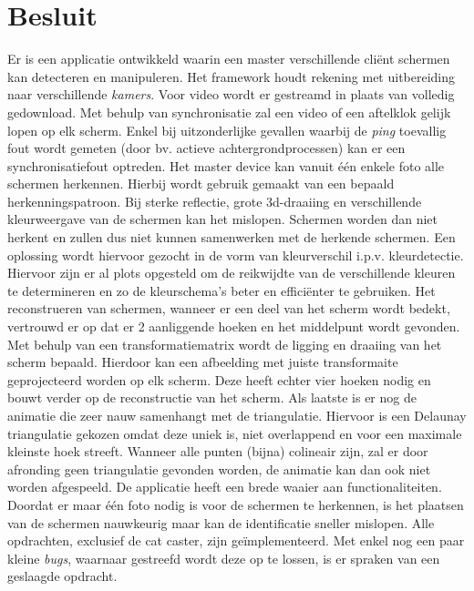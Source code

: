 \section{Besluit}
Er is een applicatie ontwikkeld waarin een master verschillende cliënt schermen kan detecteren en manipuleren. Het framework houdt rekening met uitbereiding naar verschillende {\it kamers}. Voor video wordt er gestreamd in plaats van volledig gedownload. Met behulp van synchronisatie zal een video of een aftelklok gelijk lopen op elk scherm. Enkel bij uitzonderlijke gevallen waarbij de {\it ping} toevallig fout wordt gemeten (door bv. actieve achtergrondprocessen) kan er een synchronisatiefout optreden.
\bigskip
Het master device kan vanuit één enkele foto alle schermen herkennen. Hierbij wordt gebruik gemaakt van een bepaald herkenningspatroon. Bij sterke reflectie, grote 3d-draaiing en verschillende kleurweergave van de schermen kan het mislopen. Schermen worden dan niet herkent en zullen dus niet kunnen samenwerken met de herkende schermen. Een oplossing wordt hiervoor gezocht in de vorm van kleurverschil i.p.v. kleurdetectie. Hiervoor zijn er al plots opgesteld om de reikwijdte van de verschillende kleuren te determineren en zo de kleurschema's beter en efficiënter te gebruiken.
\bigskip
Het reconstrueren van schermen, wanneer er een deel van het scherm wordt bedekt, vertrouwd er op dat er 2 aanliggende hoeken en het middelpunt wordt gevonden. Met behulp van een transformatiematrix wordt de ligging en draaiing van het scherm bepaald. Hierdoor kan een afbeelding met juiste transformaite geprojecteerd worden op elk scherm. Deze heeft echter vier hoeken nodig en bouwt verder op de reconstructie van het scherm.
\bigskip
Als laatste is er nog de animatie die zeer nauw samenhangt met de triangulatie. Hiervoor is een Delaunay triangulatie gekozen omdat deze uniek is, niet overlappend en voor een maximale kleinste hoek streeft. Wanneer alle punten (bijna) colineair zijn, zal er door afronding geen triangulatie gevonden worden, de animatie kan dan ook niet worden afgespeeld.
\bigskip
De applicatie heeft een brede waaier aan functionaliteiten. Doordat er maar één foto nodig is voor de schermen te herkennen, is het plaatsen van de schermen nauwkeurig maar kan de identificatie sneller mislopen. Alle opdrachten, exclusief de cat caster, zijn geïmplementeerd. Met enkel nog een paar kleine {\it bugs}, waarnaar gestreefd wordt deze op te lossen, is er spraken van een geslaagde opdracht.
